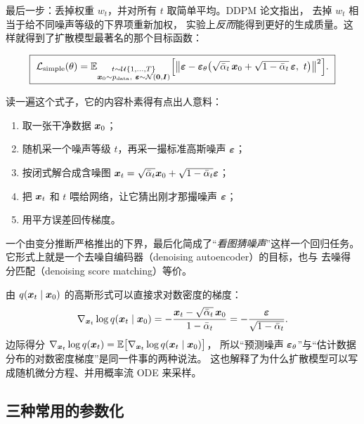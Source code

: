 最后一步：丢掉权重 $w_t$，并对所有 $t$ 取简单平均。DDPM 论文指出，
去掉 $w_t$ 相当于给不同噪声等级的下界项重新加权，
实验上\emph{反而}能得到更好的生成质量\cite{ho2020ddpm}。这样就得到了扩散模型最著名的那个目标函数：

\begin{equation}
  \boxed{\
  \mathcal{L}_{\text{simple}}(\theta)
  =\E_{\substack{t\sim\mathcal{U}\{1,\dots,T\}\\ \bx_0\sim p_{\text{data}},\ \beps\sim\Ncal(\bzero,\bI)}}
  \Bigl[\bigl\|\beps-\beps_\theta\bigl(\sqrt{\abt}\,\bx_0+\sqrt{1-\abt}\,\beps,\ t\bigr)\bigr\|^2\Bigr].
  \ }
  \label{eq:l-simple}
\end{equation}

读一遍这个式子，它的内容朴素得有点出人意料：

\begin{enumerate}
  \item 取一张干净数据 $\bm{x}_0$；
  \item 随机采一个噪声等级 $t$，再采一撮标准高斯噪声 $\bm{\varepsilon}$；
  \item 按闭式解合成含噪图 $\bm{x}_t=\sqrt{\bar{\alpha}_t}\bm{x}_0+\sqrt{1-\bar{\alpha}_t}\bm{\varepsilon}$；
  \item 把 $\bm{x}_t$ 和 $t$ 喂给网络，让它猜出刚才那撮噪声 $\bm{\varepsilon}$；
  \item 用平方误差回传梯度。
\end{enumerate}

一个由变分推断严格推出的下界，最后化简成了“\emph{看图猜噪声}”这样一个回归任务。
它形式上就是一个去噪自编码器（denoising autoencoder）的目标，也与
去噪得分匹配（denoising score matching）等价\cite{vincent2011connection,song2021sde}。

\begin{keybox}[预测噪声 $=$ 估计得分]
由 $q(\bm{x}_t\mid\bm{x}_0)$ 的高斯形式可以直接求对数密度的梯度：
\begin{equation*}
  \nabla_{\bm{x}_t}\log q(\bm{x}_t\mid\bm{x}_0)
  =-\frac{\bm{x}_t-\sqrt{\bar{\alpha}_t}\,\bm{x}_0}{1-\bar{\alpha}_t}
  =-\frac{\bm{\varepsilon}}{\sqrt{1-\bar{\alpha}_t}} .
\end{equation*}
边际得分 $\nabla_{\bm{x}_t}\log q(\bm{x}_t)=\mathbb{E}\bigl[\nabla_{\bm{x}_t}\log q(\bm{x}_t\mid\bm{x}_0)\bigr]$，
所以“预测噪声 $\bm{\varepsilon}_\theta$”与“估计数据分布的对数密度梯度”是同一件事的两种说法。
这也解释了为什么扩散模型可以写成随机微分方程、并用概率流 ODE 来采样。
\end{keybox}

\subsection{三种常用的参数化}

